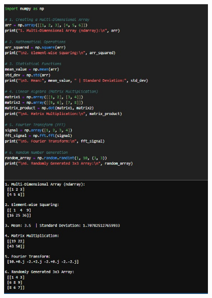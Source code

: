 \documentclass{article}
\begin{document}
\includegraphics[width=14cm,height=15cm]{NumPy.jpeg}
\newpage
\end{document}
